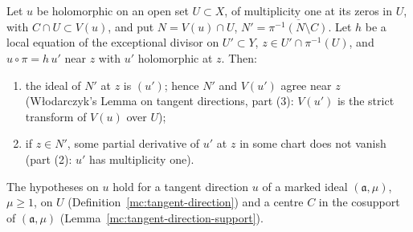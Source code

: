 \begin{theorem}
\label{bcalc:giraud-local}
\mixedleanok
Let \(u\) be holomorphic on an open set \(U\subset X\), of multiplicity one at its zeros in \(U\), with \(C\cap U\subset V(u)\), and put
\(N=V(u)\cap U\), \(N'=\overline{\pi^{-1}(N\setminus C)}\). Let \(h\) be a local equation of the exceptional divisor on \(U'\subset Y\),
\(z\in U'\cap\pi^{-1}(U)\), and \(u\circ\pi=h\,u'\) near \(z\) with \(u'\) holomorphic at \(z\). Then:
\begin{enumerate}
\item the ideal of \(N'\) at \(z\) is \((u')\); hence \(N'\) and \(V(u')\) agree near \(z\) (Włodarczyk's Lemma on tangent directions, part (3): \(V(u')\)
is the strict transform of \(V(u)\) over \(U\));
\item if \(z\in N'\), some partial derivative of \(u'\) at \(z\) in some chart does not vanish (part (2): \(u'\) has multiplicity one).
\end{enumerate}
The hypotheses on \(u\) hold for a tangent direction \(u\) of a marked ideal \((\mathfrak a,\mu)\), \(\mu\ge1\), on \(U\)
(Definition~\ref{mc:tangent-direction}) and a centre \(C\) in the cosupport of \((\mathfrak a,\mu)\) (Lemma~\ref{mc:tangent-direction-support}).
\end{theorem}

